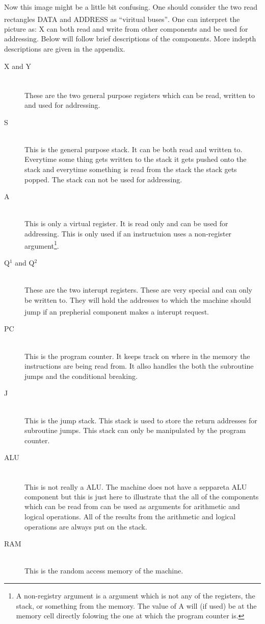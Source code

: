 \documentclass{article}
\begin{document}
Now this image might be a little bit confusing. One should consider the two read
rectangles DATA and ADDRESS as ``viritual buses''\textsuperscript{\cite{bus}}.
One can interpret the picture as: X can both read and write from other components and be used for addressing.
Below will follow brief descriptions of the components. More indepth
descriptions are given in the appendix.

\begin{description}
  \item[X and Y] \hfill \\ 
  These are the two general purpose registers\textsuperscript{\cite{register}}
  which can be read, written to and used for addressing.
  \item[S] \hfill \\
  This is the general purpose stack. It can be both read and
  written to. Everytime some thing gets written to the stack it gets pushed onto the
  stack and everytime something is read from the stack the stack gets popped.
  The stack can not be used for addressing.
  \item[A] \hfill \\
  This is only a virtual register. It is read only and can be used for
  addressing. This is only used if an instructuion uses a non-register
  argument\footnote{A non-registry argument is a argument which is not any of
  the registers, the stack, or something from the memory. The value of A will
  (if used) be at the memory cell directly folowing the one at which the
  program counter is.}.
  \item[Q$^1$ and Q$^2$] \hfill \\
  These are the two interupt registers. These are very special and can only be
  written to. They will hold the addresses to which the machine should jump if an
  prepherial component makes a interupt request\textsuperscript{\cite{irq}}.
  
  \item[PC]\hfill \\
  This is the program counter. It keeps track on where in the memory the 
  instructions are being read from. It allso handles the both the subroutine
  jumps and the conditional breaking.
  \item[J]\hfill \\
  This is the jump stack. This stack is used to store the return addresses for
  subroutine jumps. This stack can only be manipulated by the program counter.
  \item[ALU]\hfill \\
  This is not really a ALU\textsuperscript{\cite{alu}}. The machine does not
  have a seppareta ALU component but this is just here to illustrate that the all of the components which can
  be read from can be used as arguments for arithmetic and logical operations.
  All of the results from the arithmetic and logical operations are always put
  on the stack.
  \item[RAM]\hfill \\
  This is the random access memory of the machine.
\end{description}
\end{document}
